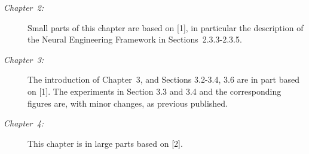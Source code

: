 \begin{description}
	\item[\normalfont\emph{Chapter~2:}] Small parts of this chapter are based on [1], in particular the description of the Neural Engineering Framework in Sections~2.3.3-2.3.5.
	\item[\normalfont\emph{Chapter~3:}] The introduction of Chapter~3, and Sections 3.2-3.4, 3.6 are in part based on [1].
	The experiments in Section 3.3 and 3.4 and the corresponding figures are, with minor changes, as previous published.
	\item[\normalfont\emph{Chapter~4:}] This chapter is in large parts based on [2].
\end{description}

\clearpage